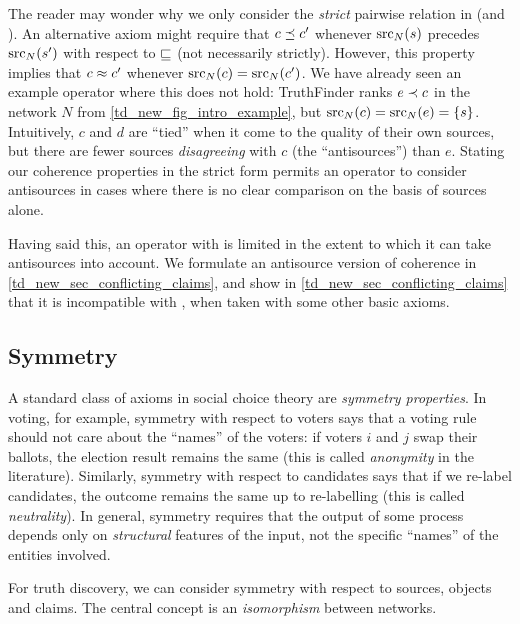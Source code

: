 The reader may wonder why we only consider the \emph{strict} pairwise relation
in \claimcoherence{} (and \sourcecoherence{}). An alternative axiom might
require that $c \preceq c'$ whenever $\operatorname{src}_N(s)$ precedes $\operatorname{src}_N(s')$ with
respect to $\sqsubseteq$ (not necessarily strictly). However, this property implies
that $c \approx c'$ whenever $\operatorname{src}_N(c) = \operatorname{src}_N(c')$. We have already seen an
example operator where this does not hold: TruthFinder ranks $e \prec c$ in the
network $N$ from \cref{td_new_fig_intro_example}, but $\operatorname{src}_N(c) = \operatorname{src}_N(e) =
\{s\}$. Intuitively, $c$ and $d$ are ``tied'' when it come to the quality of
their own sources, but there are fewer sources \emph{disagreeing} with $c$ (the
``antisources'') than $e$. Stating our coherence properties in the strict form
permits an operator to consider antisources in cases where there is no clear
comparison on the basis of sources alone.

Having said this, an operator with \claimcoherence{} is limited in the extent
to which it can take antisources into account. We formulate
an antisource version of coherence in \cref{td_new_sec_conflicting_claims}, and
show in \cref{td_new_sec_conflicting_claims} that it is
incompatible with \claimcoherence{}, when taken with some other basic axioms.


\subsection{Symmetry}

A standard class of axioms in social choice theory are \emph{symmetry
properties}. In voting, for example, symmetry with respect to voters says that
a voting rule should not care about the ``names'' of the voters: if voters $i$
and $j$ swap their ballots, the election result remains the same (this is
called \emph{anonymity} in the literature). Similarly, symmetry with respect to
candidates says that if we re-label candidates, the outcome remains the same up
to re-labelling (this is called \emph{neutrality}). In general, symmetry
requires that the output of some process depends only on \emph{structural}
features of the input, not the specific ``names'' of the entities involved.

For truth discovery, we can consider symmetry with respect to sources, objects
and claims. The central concept is an \emph{isomorphism} between networks.

